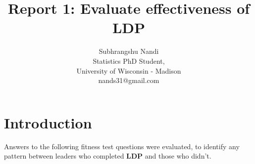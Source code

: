\documentclass[11pt]{extarticle} %
\begin{document}

\title{Report 1: Evaluate effectiveness of LDP}
\author{Subhrangshu Nandi\\
  Statistics PhD Student, \\
  University of Wisconsin - Madison \\
  nands31@gmail.com}
\date{}

\maketitle

\newpage
\section*{Introduction}
Answers to the following fitness test questions were evaluated, to identify any pattern between leaders who completed {\bf{LDP}} and those who didn't. 
\end{document}
